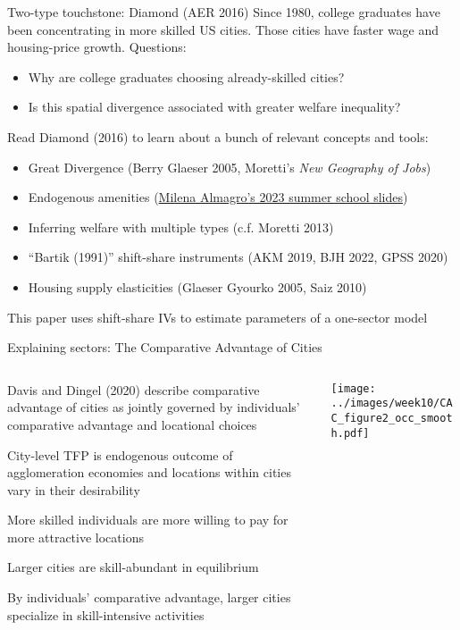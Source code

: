 \documentclass[11pt,notes=hide,aspectratio=169]{beamer}
\begin{document}
\begin{frame}{Two-type touchstone: Diamond (AER 2016)}
Since 1980, college graduates have been concentrating in more skilled US cities.
Those cities have faster wage and housing-price growth. Questions:
\begin{itemize}
	\item Why are college graduates choosing already-skilled cities?
	\item Is this spatial divergence associated with greater welfare inequality?
\end{itemize}
\medskip
Read Diamond (2016) to learn about a bunch of relevant concepts and tools:
\begin{itemize}
	\item Great Divergence (Berry Glaeser 2005, Moretti's \textit{New Geography of Jobs})
	\item Endogenous amenities (\href{https://m-almagro.github.io/UEA_Summer_School_2023.pdf}{Milena Almagro's 2023 summer school slides})
	\item Inferring welfare with multiple types (c.f. Moretti 2013)
	\item ``Bartik (1991)'' shift-share instruments (AKM 2019, BJH 2022, GPSS 2020)
	\item Housing supply elasticities (Glaeser Gyourko 2005, Saiz 2010)
\end{itemize}
This paper uses shift-share IVs to estimate parameters of a one-sector model
\end{frame}
\begin{frame}{Explaining sectors: The Comparative Advantage of Cities}
\begin{columns}
\begin{column}{0.64\textwidth}
\begin{itemize}{\small
\item Davis and Dingel (2020) describe comparative advantage of cities as jointly governed by
individuals' comparative advantage and locational choices
\item City-level TFP is endogenous outcome of agglomeration economies and 
locations within cities vary in their desirability
\item More skilled individuals are more willing to pay for more attractive locations
\item Larger cities are skill-abundant in equilibrium
\item By individuals' comparative advantage, larger cities
specialize in skill-intensive activities
}\end{itemize}
\end{column}
\begin{column}{0.34\textwidth}
\texttt{[image: ../images/week10/CAC\_figure2\_occ\_smooth.pdf]}
\end{column}
\end{columns}
\end{frame}
\end{document}
